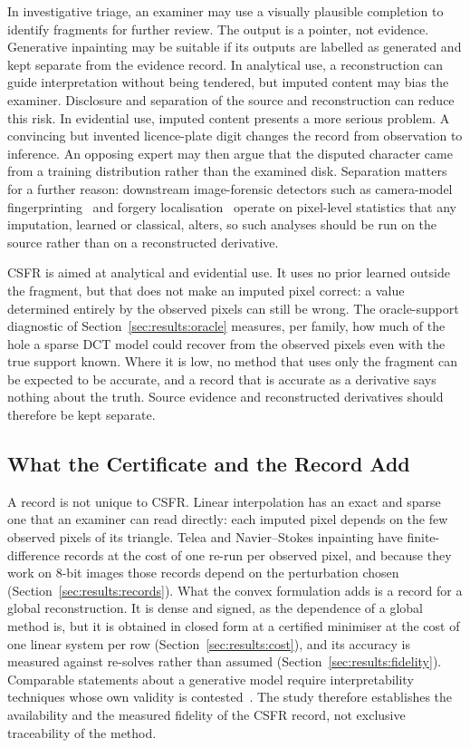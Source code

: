 \documentclass[final,3p]{elsarticle}
\begin{document}
In investigative triage, an examiner may use a visually plausible completion to identify fragments for further review. The output is a pointer, not evidence. Generative inpainting may be suitable if its outputs are labelled as generated and kept separate from the evidence record. In analytical use, a reconstruction can guide interpretation without being tendered, but imputed content may bias the examiner. Disclosure and separation of the source and reconstruction can reduce this risk. In evidential use, imputed content presents a more serious problem. A convincing but invented licence-plate digit changes the record from observation to inference. An opposing expert may then argue that the disputed character came from a training distribution rather than the examined disk. Separation matters for a further reason: downstream image-forensic detectors such as camera-model fingerprinting~\cite{cozzolino2020noiseprint} and forgery localisation~\cite{zhuo2022selfadversarial,wu2022robust} operate on pixel-level statistics that any imputation, learned or classical, alters, so such analyses should be run on the source rather than on a reconstructed derivative.

CSFR is aimed at analytical and evidential use. It uses no prior learned outside the fragment, but that does not make an imputed pixel correct: a value determined entirely by the observed pixels can still be wrong. The oracle-support diagnostic of Section~\ref{sec:results:oracle} measures, per family, how much of the hole a sparse DCT model could recover from the observed pixels even with the true support known. Where it is low, no method that uses only the fragment can be expected to be accurate, and a record that is accurate as a derivative says nothing about the truth. Source evidence and reconstructed derivatives should therefore be kept separate.

\subsection{What the Certificate and the Record Add}

A record is not unique to CSFR. Linear interpolation has an exact and sparse one that an examiner can read directly: each imputed pixel depends on the few observed pixels of its triangle. Telea and Navier--Stokes inpainting have finite-difference records at the cost of one re-run per observed pixel, and because they work on 8-bit images those records depend on the perturbation chosen (Section~\ref{sec:results:records}). What the convex formulation adds is a record for a global reconstruction. It is dense and signed, as the dependence of a global method is, but it is obtained in closed form at a certified minimiser at the cost of one linear system per row (Section~\ref{sec:results:cost}), and its accuracy is measured against re-solves rather than assumed (Section~\ref{sec:results:fidelity}). Comparable statements about a generative model require interpretability techniques whose own validity is contested~\cite{bhadra2021hallucinations,horsman2024sources}. The study therefore establishes the availability and the measured fidelity of the CSFR record, not exclusive traceability of the method.
\end{document}
